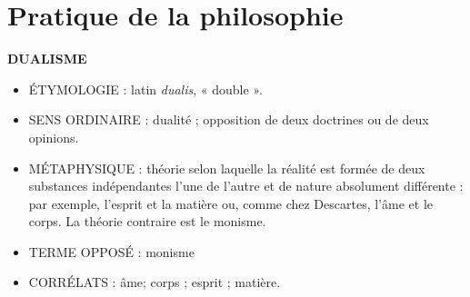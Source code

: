
\section{Pratique de la philosophie}
{\bf D{\footnotesize UALISME}}

\begin{itemize}[leftmargin=1cm, label=, itemsep=1pt]
\item {\footnotesize ÉTYMOLOGIE} :  latin {\it dualis}, « double ».
\item {\footnotesize SENS ORDINAIRE} : dualité ; opposition de deux doctrines ou de deux opinions.
\item {\footnotesize MÉTAPHYSIQUE} : théorie selon laquelle la réalité
est formée de deux substances indépendantes l’une de l’autre et de
nature absolument différente : par exemple, l'esprit et la matière ou,
comme chez Descartes, l'âme et le corps. La théorie contraire est le
monisme.
\end{itemize}

\begin{itemize}[leftmargin=1cm, label=, itemsep=1pt]
\item {\footnotesize TERME OPPOSÉ} : monisme
\item {\footnotesize CORRÉLATS} : âme; corps ; esprit ; matière.
\end{itemize}

